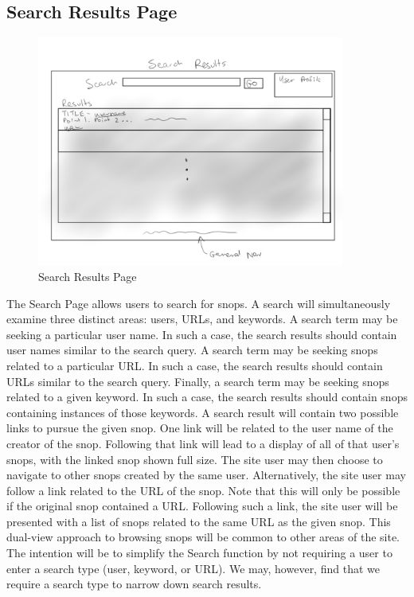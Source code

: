 \documentclass[11pt]{article}
\begin{document}
\subsection{Search Results Page}
\label{sec:search_results_page}
\begin{figure}[htb]
\begin{center}
\includegraphics[width=0.9\textwidth]{search_results.png}
\caption{Search Results Page}
\label{fig:fig_search_results_page}
\end{center}
\end{figure}
The Search Page allows users to search for snops. A search will simultaneously examine three distinct areas: users, URLs, and keywords.
A search term may be seeking a particular user name. In such a case, the search results should contain user names similar to the search query.
A search term may be seeking snops related to a particular URL. In such a case, the search results should contain URLs similar to the search query. Finally, a search term may be seeking snops related to a given keyword. In such a case, the search results should contain snops containing instances of those keywords. A search result will contain two possible links to pursue the given snop. One link will be related to the user name of the creator of the snop. Following that link will lead to a display of all of that user's snops, with the linked snop shown full size. The site user may then choose to navigate to other snops created by the same user. Alternatively, the site user may follow a link related to the URL of the snop. Note that this will only be possible if the original snop contained a URL. Following such a link, the site user will be presented with a list of snops related to the same URL as the given snop. This dual-view approach to browsing snops will be common to other areas of the site.
The intention will be to simplify the Search function by not requiring a user to enter a search type (user, keyword, or URL). We may, however, find that we require a search type to narrow down search results.
\end{document}

